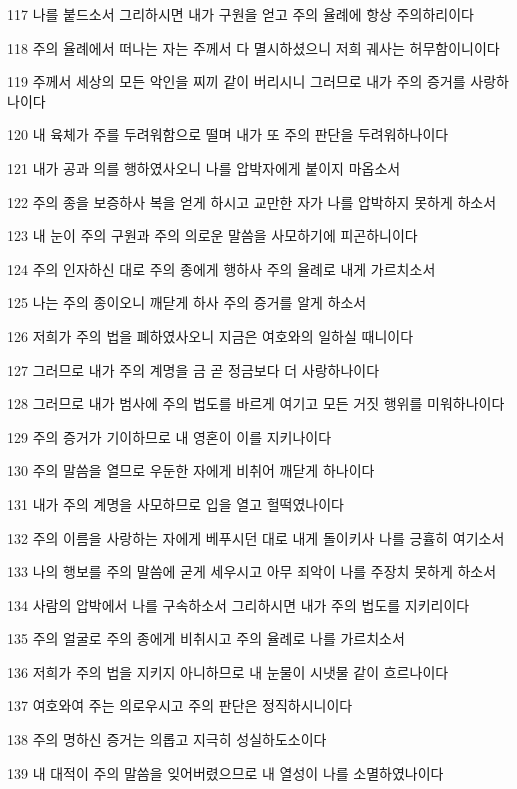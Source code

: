 \par 117 나를 붙드소서 그리하시면 내가 구원을 얻고 주의 율례에 항상 주의하리이다
\par 118 주의 율례에서 떠나는 자는 주께서 다 멸시하셨으니 저희 궤사는 허무함이니이다
\par 119 주께서 세상의 모든 악인을 찌끼 같이 버리시니 그러므로 내가 주의 증거를 사랑하나이다
\par 120 내 육체가 주를 두려워함으로 떨며 내가 또 주의 판단을 두려워하나이다
\par 121 내가 공과 의를 행하였사오니 나를 압박자에게 붙이지 마옵소서
\par 122 주의 종을 보증하사 복을 얻게 하시고 교만한 자가 나를 압박하지 못하게 하소서
\par 123 내 눈이 주의 구원과 주의 의로운 말씀을 사모하기에 피곤하니이다
\par 124 주의 인자하신 대로 주의 종에게 행하사 주의 율례로 내게 가르치소서
\par 125 나는 주의 종이오니 깨닫게 하사 주의 증거를 알게 하소서
\par 126 저희가 주의 법을 폐하였사오니 지금은 여호와의 일하실 때니이다
\par 127 그러므로 내가 주의 계명을 금 곧 정금보다 더 사랑하나이다
\par 128 그러므로 내가 범사에 주의 법도를 바르게 여기고 모든 거짓 행위를 미워하나이다
\par 129 주의 증거가 기이하므로 내 영혼이 이를 지키나이다
\par 130 주의 말씀을 열므로 우둔한 자에게 비취어 깨닫게 하나이다
\par 131 내가 주의 계명을 사모하므로 입을 열고 헐떡였나이다
\par 132 주의 이름을 사랑하는 자에게 베푸시던 대로 내게 돌이키사 나를 긍휼히 여기소서
\par 133 나의 행보를 주의 말씀에 굳게 세우시고 아무 죄악이 나를 주장치 못하게 하소서
\par 134 사람의 압박에서 나를 구속하소서 그리하시면 내가 주의 법도를 지키리이다
\par 135 주의 얼굴로 주의 종에게 비취시고 주의 율례로 나를 가르치소서
\par 136 저희가 주의 법을 지키지 아니하므로 내 눈물이 시냇물 같이 흐르나이다
\par 137 여호와여 주는 의로우시고 주의 판단은 정직하시니이다
\par 138 주의 명하신 증거는 의롭고 지극히 성실하도소이다
\par 139 내 대적이 주의 말씀을 잊어버렸으므로 내 열성이 나를 소멸하였나이다
